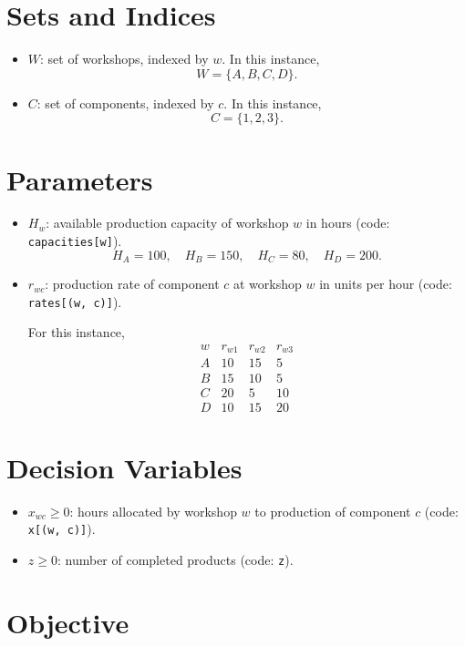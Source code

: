\section*{Sets and Indices}

\begin{itemize}
    \item $W$: set of workshops, indexed by $w$. In this instance,
    \[
    W=\{A,B,C,D\}.
    \]
    \item $C$: set of components, indexed by $c$. In this instance,
    \[
    C=\{1,2,3\}.
    \]
\end{itemize}

\section*{Parameters}

\begin{itemize}
    \item $H_w$: available production capacity of workshop $w$ in hours (code: \texttt{capacities[w]}).
    \[
    H_A=100,\quad H_B=150,\quad H_C=80,\quad H_D=200.
    \]
    \item $r_{wc}$: production rate of component $c$ at workshop $w$ in units per hour (code: \texttt{rates[(w, c)]}).
    
    For this instance,
    \[
    \begin{array}{c|ccc}
    w & r_{w1} & r_{w2} & r_{w3} \\
    \hline
    A & 10 & 15 & 5 \\
    B & 15 & 10 & 5 \\
    C & 20 & 5 & 10 \\
    D & 10 & 15 & 20
    \end{array}
    \]
\end{itemize}

\section*{Decision Variables}

\begin{itemize}
    \item $x_{wc} \ge 0$: hours allocated by workshop $w$ to production of component $c$ (code: \texttt{x[(w, c)]}).
    \item $z \ge 0$: number of completed products (code: \texttt{z}).
\end{itemize}

\section*{Objective}

